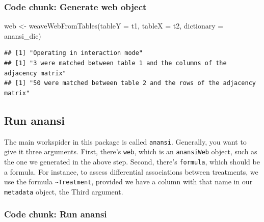 \documentclass[
]{article}
\newenvironment{Shaded}{\begin{snugshade}}{\end{snugshade}}
\newcommand{\AttributeTok}[1]{\textcolor[rgb]{0.77,0.63,0.00}{#1}}
\newcommand{\FunctionTok}[1]{\textcolor[rgb]{0.00,0.00,0.00}{#1}}
\newcommand{\NormalTok}[1]{#1}
\newcommand{\OtherTok}[1]{\textcolor[rgb]{0.56,0.35,0.01}{#1}}
\begin{document}
\hypertarget{code-chunk-generate-web-object}{%
\subsubsection{Code chunk: Generate web
object}\label{code-chunk-generate-web-object}}

\begin{Shaded}
\begin{Highlighting}[]
\NormalTok{web }\OtherTok{\textless{}{-}} \FunctionTok{weaveWebFromTables}\NormalTok{(}\AttributeTok{tableY =}\NormalTok{ t1, }\AttributeTok{tableX =}\NormalTok{ t2, }\AttributeTok{dictionary =}\NormalTok{ anansi\_dic)}
\end{Highlighting}
\end{Shaded}

\begin{verbatim}
## [1] "Operating in interaction mode"
## [1] "3 were matched between table 1 and the columns of the adjacency matrix"
## [1] "50 were matched between table 2 and the rows of the adjacency matrix"
\end{verbatim}

\newpage

\hypertarget{run-anansi}{%
\subsection{Run anansi}\label{run-anansi}}

The main workspider in this package is called \texttt{anansi}.
Generally, you want to give it three arguments. First, there's
\texttt{web}, which is an \texttt{anansiWeb} object, such as the one we
generated in the above step. Second, there's \texttt{formula}, which
should be a formula. For instance, to assess differential associations
between treatments, we use the formula
\texttt{\textasciitilde{}Treatment}, provided we have a column with that
name in our \texttt{metadata} object, the Third argument.

\hypertarget{code-chunk-run-anansi}{%
\subsubsection{Code chunk: Run anansi}\label{code-chunk-run-anansi}}
\end{document}
